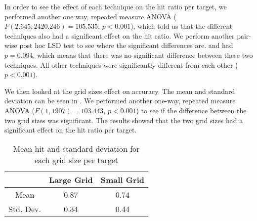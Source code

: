 In order to see the effect of each technique on the hit ratio per target, we performed another one way, repeated measure ANOVA ($F(2.645,2420.246)=105.535$, $p<0.001$), which told us that the different techniques also had a significant effect on the hit ratio. We perform another pair-wise post hoc LSD test to see where the significant differences are. \pinch and \tilt had $p=0.094$, which means that there was no significant difference between these two techniques. All other techniques were significantly different from each other ($p<0.001$). 

We then looked at the grid sizes effect on accuracy. The mean and standard deviation can be seen in . We performed another one-way, repeated measure ANOVA ($F(1,1907)=103.443$, $p<0.001$) to see if the difference between the two grid sizes was significant. The results showed that the two grid sizes had a significant effect on the hit ratio per target. 

\begin{table}[H]
	\centering
	\begin{tabular}{|c|c|c|}
		\hline
		\rowcolor[HTML]{9B9B9B} 
		& \textbf{Large Grid} & \textbf{Small Grid} \\ \hline
		Mean & 0.87 & 0.74 \\ \hline
		Std. Dev. & 0.34 & 0.44 \\ \hline
		\end{tabular}
		\caption{Mean hit and standard deviation for each grid size per target}
		\label{tab:meanHitSize}
\end{table}